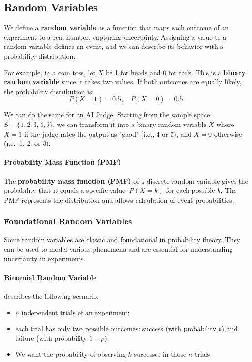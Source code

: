 \subsection{Random Variables}
We define a \textbf{random variable} as a function that maps each outcome of an experiment to a real number, capturing uncertainty.
Assigning a value to a random variable defines an event, and we can describe its behavior with a probability distribution.

For example, in a coin toss, let $X$ be 1 for heads and 0 for tails.
This is a \textbf{binary random variable} since it takes two values.
If both outcomes are equally likely, the probability distribution is:
\begin{equation}
    P(X=1) = 0.5, \quad P(X=0) = 0.5
\end{equation}

We can do the same for an AI Judge. Starting from the sample space $S = \{1, 2, 3, 4, 5\}$, we can transform it into a binary random variable $X$ 
where $X=1$ if the judge rates the output as "good" (i.e., 4 or 5), and $X=0$ otherwise (i.e., 1, 2, or 3).

\paragraph{Probability Mass Function (PMF)}
The \textbf{probability mass function (PMF)} of a discrete random variable gives the probability that it equals a specific value: $P(X=k)$ for each possible $k$.
The PMF represents the distribution and allows calculation of event probabilities.

\subsubsection{Foundational Random Variables}
Some random variables are classic and foundational in probability theory.
They can be used to model various phenomena and are essential for understanding uncertainty in experiments.

\paragraph{Binomial Random Variable} describes the following scenario:
\begin{itemize}
    \item $n$ independent trials of an experiment;
    \item each trial has only two possible outcomes: success (with probability $p$) and failure (with probability $1-p$);
    \item We want the probability of observing $k$ successes in those $n$ trials
\end{itemize}

